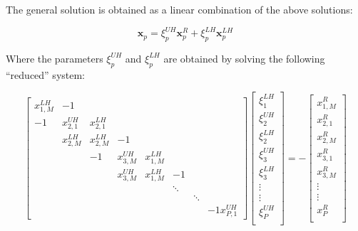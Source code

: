 \documentclass{article}
\begin{document}
    The general solution is obtained as a linear combination of the above solutions:

    \begin{equation} \label{eqn:linear-combo}
        \boldsymbol{x}_p = {\xi}_p^{UH} \boldsymbol{x}_p^R + {\xi}_p^{LH} \boldsymbol{x}_p^{LH}
    \end{equation}

    Where the parameters ${\xi}_p^{UH}$ and ${\xi}_p^{LH}$ are obtained
    by solving the following ``reduced'' system:

    \begin{equation} \label{eqn:reduced-system}
     \begin{bmatrix}
         x_{1,M}^{LH}   &   -1                                                          \\
         -1             &   x_{2,1}^{UH} &   x_{2,1}^{LH}                               \\
                        &   x_{2,M}^{LH} &   x_{2,M}^{LH}  &  -1                        \\
         &              &   -1           &   x_{3,M}^{UH}  &  x_{1,M}^{LH}              \\
         &              &   &                x_{3,M}^{UH}  &  x_{1,M}^{LH} &    -1      \\
         &              &   &            &   &             \ddots   \\
         &              &   &            &   &             &        \ddots \\
         &  &   &   &   &   &   & -1 x_{P,1}^{UH}
      \end{bmatrix}
    \begin{bmatrix}
        \xi_1^{LH} \\
        \xi_2^{UH} \\
        \xi_2^{LH} \\
        \xi_3^{UH} \\
        \xi_3^{LH} \\
        \vdots \\
        \vdots \\
        \xi_P^{UH} \\
     \end{bmatrix}
     = -
     \begin{bmatrix}
         x_{1,M}^R \\
         x_{2,1}^R \\
         x_{2,M}^R \\
         x_{3,1}^R \\
         x_{3,M}^R \\
         \vdots \\
         \vdots \\
         x_P^R \\
      \end{bmatrix}
  \end{equation}
\end{document}
